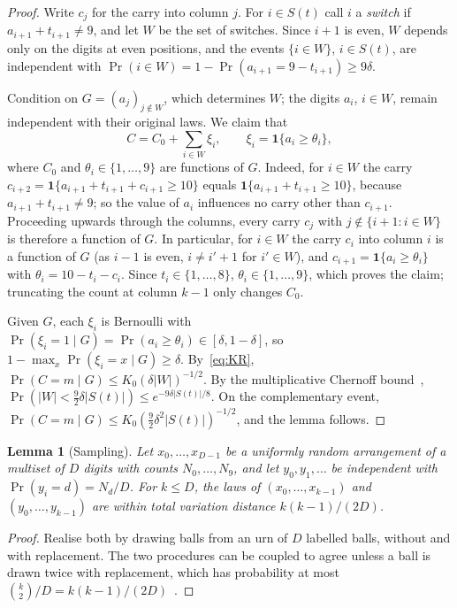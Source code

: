 \documentclass[11pt]{article}
\newtheorem{lemma}[theorem]{Lemma}
\theoremstyle{definition}
\theoremstyle{remark}
\begin{document}
\begin{proof}
Write $c_j$ for the carry into column $j$. For $i\in S(t)$ call $i$ a
\emph{switch} if $a_{i+1}+t_{i+1}\neq9$, and let $W$ be the set of switches.
Since $i+1$ is even, $W$ depends only on the digits at even positions, and
the events $\{i\in W\}$, $i\in S(t)$, are independent with
$\Pr(i\in W)=1-\Pr(a_{i+1}=9-t_{i+1})\ge9\delta$.

Condition on $G=(a_j)_{j\notin W}$, which determines $W$; the digits
$a_i$, $i\in W$, remain independent with their original laws. We claim that
\begin{equation}\label{eq:switchsum}
  C=C_0+\sum_{i\in W}\xi_i,\qquad \xi_i=\mathbf 1\{a_i\ge\theta_i\},
\end{equation}
where $C_0$ and $\theta_i\in\{1,\dots,9\}$ are functions of $G$. Indeed, for
$i\in W$ the carry $c_{i+2}=\mathbf1\{a_{i+1}+t_{i+1}+c_{i+1}\ge10\}$ equals
$\mathbf1\{a_{i+1}+t_{i+1}\ge10\}$, because $a_{i+1}+t_{i+1}\ne9$; so the value
of $a_i$ influences no carry other than $c_{i+1}$. Proceeding upwards through
the columns, every carry $c_j$ with $j\notin\{i+1:i\in W\}$ is therefore a
function of $G$. In particular, for $i\in W$ the carry $c_i$ into column $i$
is a function of $G$ (as $i-1$ is even, $i\neq i'+1$ for $i'\in W$), and
$c_{i+1}=\mathbf1\{a_i\ge\theta_i\}$ with $\theta_i=10-t_i-c_i$. Since
$t_i\in\{1,\dots,8\}$, $\theta_i\in\{1,\dots,9\}$, which proves the claim;
truncating the count at column $k-1$ only changes $C_0$.

Given $G$, each $\xi_i$ is Bernoulli with
$\Pr(\xi_i=1\mid G)=\Pr(a_i\ge\theta_i)\in[\delta,1-\delta]$, so
$1-\max_x\Pr(\xi_i=x\mid G)\ge\delta$. By~\eqref{eq:KR},
$\Pr(C=m\mid G)\le K_0(\delta|W|)^{-1/2}$. By the multiplicative Chernoff
bound~\cite[Thm.~4.5]{MitzenmacherUpfal}, $\Pr(|W|<\tfrac92\delta|S(t)|)\le e^{-9\delta|S(t)|/8}$.
On the complementary event,
$\Pr(C=m\mid G)\le K_0(\tfrac92\delta^2|S(t)|)^{-1/2}$, and the lemma follows.
\end{proof}

\begin{lemma}[Sampling]\label{lem:sampling}
Let $x_0,\dots,x_{D-1}$ be a uniformly random arrangement of a multiset of $D$
digits with counts $N_0,\dots,N_9$, and let $y_0,y_1,\dots$ be independent
with $\Pr(y_i=d)=N_d/D$. For $k\le D$, the laws of $(x_0,\dots,x_{k-1})$ and
$(y_0,\dots,y_{k-1})$ are within total variation distance $k(k-1)/(2D)$.
\end{lemma}

\begin{proof}
Realise both by drawing balls from an urn of $D$ labelled balls, without and
with replacement. The two procedures can be coupled to agree unless a ball is
drawn twice with replacement, which has probability at most
$\binom k2/D=k(k-1)/(2D)$~\cite{DiaconisFreedman}.
\end{proof}
\end{document}
